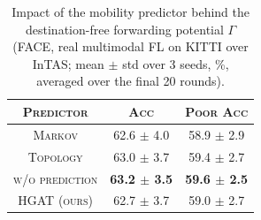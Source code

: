 \begin{table}[t]
    \centering
    \caption{Impact of the mobility predictor behind the destination-free forwarding potential $\Gamma$ (FACE, real multimodal FL on KITTI over InTAS; mean $\pm$ std over 3 seeds, \%, averaged over the final 20 rounds).}
    \label{tab:mobpred}
    \renewcommand{\arraystretch}{1.15}
    \setlength{\tabcolsep}{4.5pt}
    \begin{tabular}{c|c|c}
        \hline
        \textsc{Predictor} & \textsc{Acc} & \textsc{Poor Acc} \\
        \hline
        \textsc{Markov} & 62.6 $\pm$ 4.0 & 58.9 $\pm$ 2.9 \\
        \textsc{Topology} & 63.0 $\pm$ 3.7 & 59.4 $\pm$ 2.7 \\
        \textsc{w/o prediction} & \textbf{63.2 $\pm$ 3.5} & \textbf{59.6 $\pm$ 2.5} \\
        \hline
        \textsc{HGAT (ours)} & 62.7 $\pm$ 3.7 & 59.0 $\pm$ 2.7 \\
        \hline
    \end{tabular}
\end{table}
